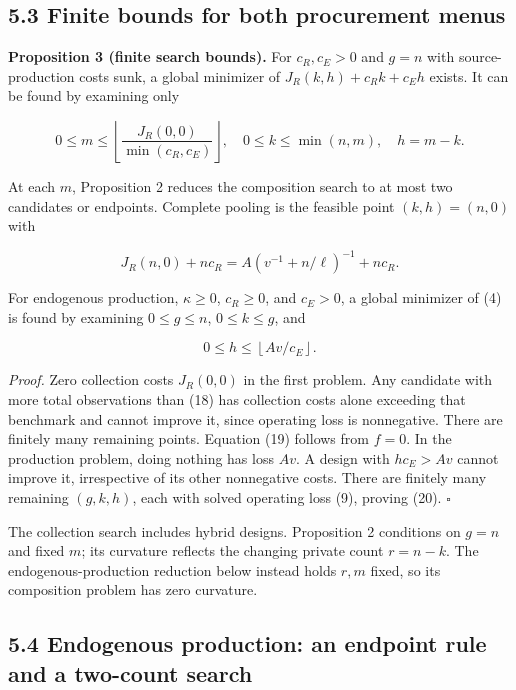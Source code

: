 \documentclass[
  11pt,
]{article}
\begin{document}
\subsection{5.3 Finite bounds for both procurement
menus}\label{finite-bounds-for-both-procurement-menus}

\textbf{Proposition 3 (finite search bounds).} For \(c_R,c_E>0\) and
\(g=n\) with source-production costs sunk, a global minimizer of
\(J_R(k,h)+c_Rk+c_Eh\) exists. It can be found by examining only

\[0\leq m\leq \left\lfloor\frac{J_R(0,0)}{\min(c_R,c_E)}\right\rfloor,
\quad 0\leq k\leq\min(n,m),\quad h=m-k. \tag{18}\]

At each \(m\), Proposition 2 reduces the composition search to at most
two candidates or endpoints. Complete pooling is the feasible point
\((k,h)=(n,0)\) with

\[J_R(n,0)+nc_R=A\left(v^{-1}+n/\ell\right)^{-1}+nc_R. \tag{19}\]

For endogenous production, \(\kappa\geq0\), \(c_R\geq0\), and \(c_E>0\),
a global minimizer of (4) is found by examining \(0\leq g\leq n\),
\(0\leq k\leq g\), and

\[0\leq h\leq\left\lfloor Av/c_E\right\rfloor. \tag{20}\]

\emph{Proof.} Zero collection costs \(J_R(0,0)\) in the first problem.
Any candidate with more total observations than (18) has collection
costs alone exceeding that benchmark and cannot improve it, since
operating loss is nonnegative. There are finitely many remaining points.
Equation (19) follows from \(f=0\). In the production problem, doing
nothing has loss \(Av\). A design with \(hc_E>Av\) cannot improve it,
irrespective of its other nonnegative costs. There are finitely many
remaining \((g,k,h)\), each with solved operating loss (9), proving
(20). \(\square\)

The collection search includes hybrid designs. Proposition 2 conditions
on \(g=n\) and fixed \(m\); its curvature reflects the changing private
count \(r=n-k\). The endogenous-production reduction below instead holds
\(r,m\) fixed, so its composition problem has zero curvature.

\subsection{5.4 Endogenous production: an endpoint rule and a two-count
search}\label{endogenous-production-an-endpoint-rule-and-a-two-count-search}
\end{document}
